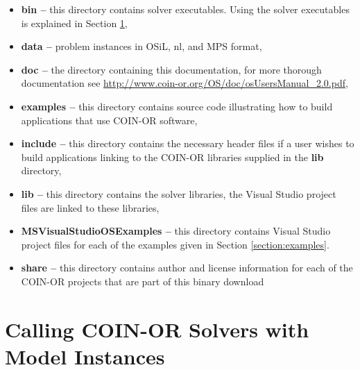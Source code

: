 \documentclass[11pt]{article}
\renewcommand{\_}{{\char"5F}}
\renewcommand{\{}{{\char"7B}}
\renewcommand{\}}{{\char"7D}}
\renewcommand{\^}{{\char"0D}}
\renewcommand{\'}{{\char"0D}}
\begin{document}
\begin{itemize}
\item {\bf bin --} this directory contains  solver executables. Using the solver executables is explained in Section \ref{section:callingsolvers},

\item {\bf data --} problem instances in OSiL, nl, and MPS format,

\item {\bf doc --} the directory containing this documentation, for more thorough documentation see  \url{http://www.coin-or.org/OS/doc/osUsersManual_2.0.pdf},

\item {\bf examples --} this directory contains source code illustrating how to build applications that use COIN-OR software, 

\item {\bf include -- } this directory contains the necessary header files if a user wishes to build applications linking to the COIN-OR libraries supplied in the {\bf lib} directory,

\item {\bf lib --} this directory contains the solver libraries, the Visual Studio project files are linked to these libraries,


\item {\bf MSVisualStudioOSExamples -- } this directory contains Visual Studio  project files for each of the examples given  in Section \ref{section:examples}.


\item {\bf share --}  this directory contains author and license information for each of the  COIN-OR projects that are part of this binary download
\end{itemize}

\section{Calling COIN-OR Solvers with Model Instances}\label{section:callingsolvers}
\end{document}
